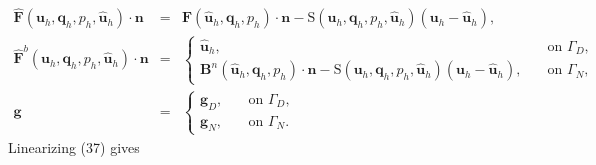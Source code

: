 \documentclass[11pt]{article}
\begin{document}
\begin{equation}
\begin{array}{rcll}
\widehat{\bm{F}} (\bm{u}_h, \bm{q}_h, p_h,\widehat{\bm{u}}_h) \cdot \bm{n} & = & {\bm{F}} (\widehat{\bm{u}}_h,\bm{q}_h,p_h) \cdot \bm{n} - \bm{\mathrm{S}} (\bm{u}_h, \bm{q}_h, p_h,\widehat{\bm{u}}_h) (\bm{u}_h - \widehat{\bm{u}}_h), \\[2ex]
\widehat{\bm{F}}^b(\bm{u}_h, \bm{q}_h, p_h,\widehat{\bm{u}}_h) \cdot \bm{n} & = & 
\left\{
\begin{array}{ll} 
\widehat{\bm{u}}_h, & \quad  \mbox{on } \Gamma_D, \\
\bm{B}^n(\widehat{\bm{u}}_h,\bm{q}_h,p_h) \cdot \bm{n} -\bm{\mathrm{S}} (\bm{u}_h, \bm{q}_h,p_h,\widehat{\bm{u}}_h) (\bm{u}_h - \widehat{\bm{u}}_h), & \quad \mbox{on }   \Gamma_N,  
\end{array}
\right. \\[3ex]
\bm{g} & = & 
\left\{
\begin{array}{ll} 
\bm{g}_D, & \quad  \mbox{on } \Gamma_D, \\
\bm{g}_N, & \quad \mbox{on }   \Gamma_N .  
\end{array}
\right.
\end{array}
\end{equation}
Linearizing (37) gives
\end{document}
